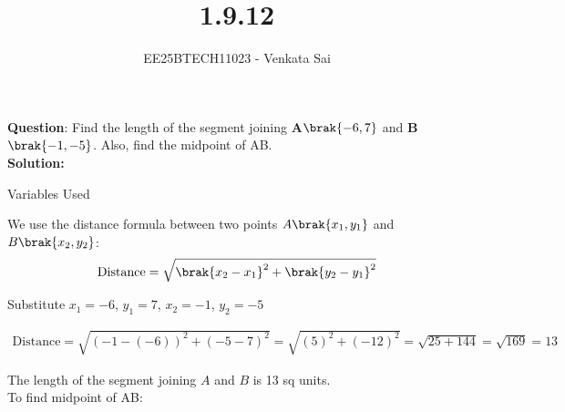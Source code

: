 \documentclass[journal]{IEEEtran}
\begin{document}


\title{1.9.12}
\author{EE25BTECH11023 - Venkata Sai}
{\let\newpage\relax\maketitle}

\renewcommand{\thefigure}{\theenumi}
\renewcommand{\thetable}{\theenumi}
\setlength{\intextsep}{10pt} %


\renewcommand{\thetable}{\theenumi}


\textbf{Question}:\newline
Find the length of the segment joining \textbf{A}$\brak{-6,7}$ and \textbf{B}$\brak{-1,-5}$. Also, find the
midpoint of AB. 
\\
\textbf{Solution: }
\begin{table}[h!]    
  \centering
  
  \caption{Variables Used}
\end{table}
We use the distance formula between two points $ A\brak{x_1, y_1} $ and $ B\brak{x_2, y_2} $:
\begin{align}
\text{Distance} = \sqrt{\brak{x_2 - x_1}^2 + \brak{y_2 - y_1}^2}
\end{align}

Substitute $ x_1 = -6 $, $ y_1 = 7 $, $ x_2 = -1 $, $ y_2 = -5 $

\begin{align}
\text{Distance} = \sqrt{(-1 - (-6))^2 + (-5 - 7)^2} = \sqrt{(5)^2 + (-12)^2} = \sqrt{25 + 144} = \sqrt{169} = 13
\end{align}

The length of the segment joining $ A $ and $ B $ is 13 sq units. \\

To find midpoint of AB:
\end{document}
